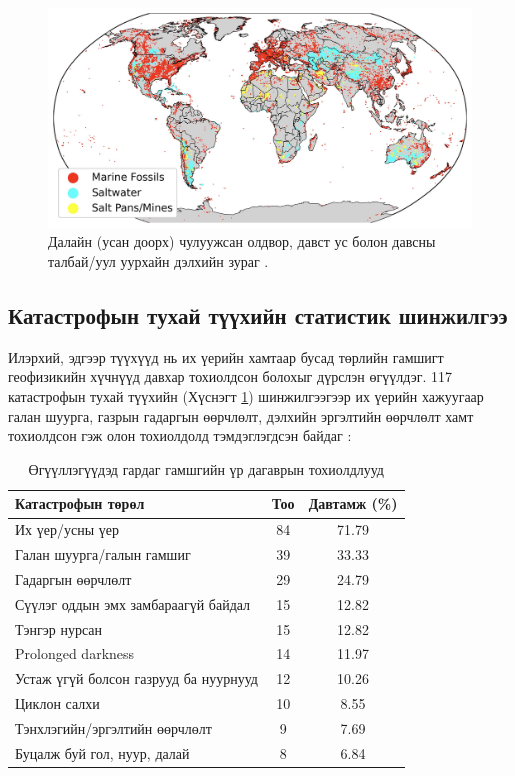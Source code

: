 \documentclass[10pt,twocolumn,letterpaper]{article}
\begin{document}
\begin{figure}[b]
\begin{center}
\includegraphics[width=1\textwidth]{marine.jpg}
\end{center}
   \caption{Далайн (усан доорх) чулуужсан олдвор, давст ус болон давсны талбай/уул уурхайн дэлхийн зураг \cite{15,16,86,87}.}
   \label{fig:2}
\end{figure}

\subsection{Катастрофын тухай түүхийн статистик шинжилгээ}

Илэрхий, эдгээр түүхүүд нь их үерийн хамтаар бусад төрлийн гамшигт геофизикийн хүчнүүд давхар тохиолдсон болохыг дүрслэн өгүүлдэг. 117 катастрофын тухай түүхийн (Хүснэгт \ref{tab: 1}) шинжилгээгээр их үерийн хажуугаар галан шуурга, газрын гадаргын өөрчлөлт, дэлхийн эргэлтийн өөрчлөлт хамт тохиолдсон гэж олон тохиолдолд тэмдэглэгдсэн байдаг \cite{14}:

\begin{table}[ht]
\begin{center}
\renewcommand{\arraystretch}{1.2}  %
\begin{tabular}{|l|c|c|}
\hline
\textbf{Катастрофын төрөл} & \textbf{Тоо} & \textbf{Давтамж (\%)} \\
\hline\hline
Их үер/усны үер           & 84 & 71.79 \\
Галан шуурга/галын гамшиг & 39 & 33.33 \\
Гадаргын өөрчлөлт         & 29 & 24.79 \\
Сүүлэг оддын эмх замбараагүй байдал & 15 & 12.82 \\
Тэнгэр нурсан              & 15 & 12.82 \\

Prolonged darkness      & 14 & 11.97 \\
Устаж үгүй болсон газрууд ба нуурнууд    & 12 & 10.26 \\
Циклон салхи          & 10 & 8.55  \\
Тэнхлэгийн/эргэлтийн өөрчлөлт & 9 & 7.69  \\
Буцалж буй гол, нуур, далай & 8 & 6.84 \\
\hline
\end{tabular}
\end{center}
\caption{Өгүүллэгүүдэд гардаг гамшгийн үр дагаврын тохиолдлууд}
\label{tab: 1}
\end{table}
\end{document}
